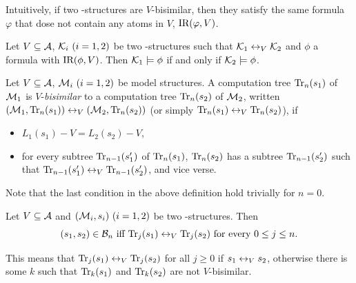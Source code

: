 \documentclass{article}
\begin{document}
Intuitively, if two \MPK-structures are $V$-bisimilar, then they satisfy the same formula $\varphi$ that dose not contain any atoms in $V$, \ie $\textrm{IR}(\varphi, V)$.
\begin{theorem}\label{thm:V-bisimulation:EQ}
  Let $V\subseteq\cal A$, ${\cal K}_i~(i=1,2)$ be two \MPK-structures such that
  ${\cal K}_1\leftrightarrow_V{\cal K}_2$ and $\phi$ a formula with $\textrm{IR}(\phi,V)$. Then
  ${\cal K}_1\models\phi$ if and only if ${\cal K}_2\models\phi$.
\end{theorem}


Let $V\subseteq\cal A$, ${\cal M}_i~(i=1,2)$ be  model structures.
A computation tree $\textrm{Tr}_n(s_1)$ of ${\cal M}_1$ is $V$-{\em bisimilar}
to a computation tree $\textrm{Tr}_n(s_2)$ of ${\cal M}_2$, written
$({\cal M}_1,\textrm{Tr}_n(s_1))\leftrightarrow_V({\cal M}_2,\textrm{Tr}_n(s_2))$ (or simply
$\textrm{Tr}_n(s_1)\leftrightarrow_V\textrm{Tr}_n(s_2)$), if %
\begin{itemize}
  \item $L_1(s_1)- V=L_2(s_2)- V$,
  \item for every subtree $\textrm{Tr}_{n-1}(s_1')$ of $\textrm{Tr}_n(s_1)$,
  $\textrm{Tr}_n(s_2)$ has a subtree $\textrm{Tr}_{n-1}(s_2')$ such that
  $\textrm{Tr}_{n-1}(s_1')\leftrightarrow_V\textrm{Tr}_{n-1}(s_2')$, and vice verse.
\end{itemize}
Note that the last condition in the above definition
hold trivially for $n=0$.

\begin{proposition}\label{B_to_T}
  Let $V\subseteq\cal A$ and $({\cal M}_i,s_i)~(i=1,2)$ be two \MPK-structures.
  Then
  \[(s_1,s_2)\in{\cal B}_n\mbox{ iff }
  \textrm{Tr}_j(s_1)\leftrightarrow_V\textrm{Tr}_j(s_2)\mbox{ for every $0\le j\le n$}.\]
\end{proposition}
This means that $\textrm{Tr}_j(s_1) \leftrightarrow_V \textrm{Tr}_j(s_2)$ for all $j \geq 0$ if $s_1 \leftrightarrow_V s_2$, otherwise there is some $k$ such that $\textrm{Tr}_k(s_1)$ and $\textrm{Tr}_k(s_2)$ are not $V$-bisimilar.
\end{document}
